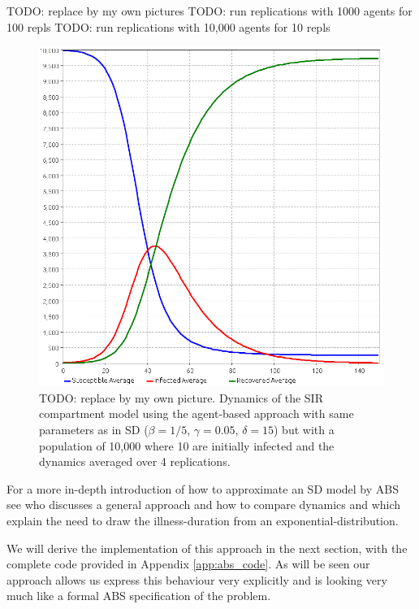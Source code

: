 TODO: replace by my own pictures
TODO: run replications with 1000 agents for 100 repls
TODO: run replications with 10,000 agents for 10 repls

\begin{figure}
	\centering
	\includegraphics[width=.3\textwidth, angle=0]{./../shared/fig/anylogic/SIR_ABS_ANYLOGIC_10000Agents_10Init_1000Repls.png}
	\caption{TODO: replace by my own picture. Dynamics of the SIR compartment model using the agent-based approach with same parameters as in SD ($\beta = 1/5$, $\gamma = 0.05$, $\delta = 15$) but with a population of 10,000 where 10 are initially infected and the dynamics averaged over 4 replications.}
	\label{fig:sir_abs_agents_repls}
\end{figure}

For a more in-depth introduction of how to approximate an SD model by ABS see \cite{macal_agent-based_2010} who discusses a general approach and how to compare dynamics and \cite{borshchev_system_2004} which explain the need to draw the illness-duration from an exponential-distribution.

We will derive the implementation of this approach in the next section, with the complete code provided in Appendix \ref{app:abs_code}. As will be seen our approach allows us express this behaviour very explicitly and is looking very much like a formal ABS specification of the problem. 
